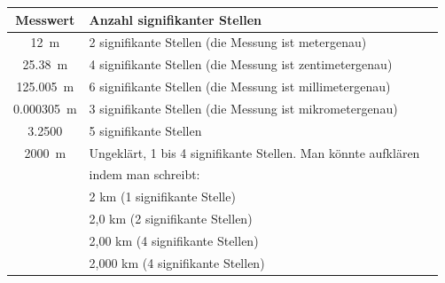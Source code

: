 \begin{example}

\begin{tabular}{clc}

Messwert & Anzahl signifikanter Stellen \\
\midrule
\SI{12}{m} & 2 signifikante Stellen (die Messung ist metergenau) \\
\SI{25.38}{m} & 4 signifikante Stellen (die Messung ist zentimetergenau)  \\
\SI{125.005}{m} & 6 signifikante Stellen (die Messung ist millimetergenau) \\
\SI{0.000305}{m} & 3 signifikante Stellen (die Messung ist mikrometergenau) \\
\SI{3.2500}{} & 5 signifikante Stellen \\
\SI{2000}{m} & Ungeklärt, 1 bis 4 signifikante Stellen. Man könnte aufklären \\
 & indem man schreibt: \\
 & 2 km (1 signifikante Stelle) \\
 & 2,0 km (2 signifikante Stellen) \\ 
 & 2,00 km (4 signifikante Stellen) \\
 & 2,000 km (4 signifikante Stellen)  \\


\end{tabular}
\end{example}
